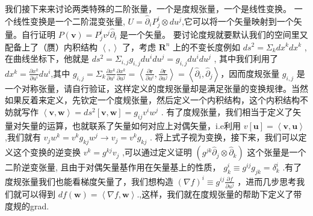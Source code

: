 \documentclass[supercite]{HustGraduPaper}
\newcommand{\inp}[2]{\left\langle #1,#2 \right\rangle}
\begin{document}
\begin{appendices}
		我们接下来来讨论两类特殊的二阶张量，一个是度规张量，一个是线性变换。
		一个线性变换是一个二阶混变张量, $U = \hat \partial_i P^i_j  \otimes du^j $,它可以将一个矢量映射到一个矢量。自行证明 $P(\mathbf{v}) = P^i_j v^j \hat \partial_i$ 是一个矢量。
		要讨论度规就要默认我们的空间里又配备上了（赝）内积结构 $\inp{ }{ }$ 了，考虑 $\mathbf{R}^n$ 上的不变长度例如 $ds^2 = \Sigma_k dx^k dx^k$ ,在曲线坐标下，他就是 $ds^2 = \Sigma_{i,j} g_{i,j}du^idu^j = g_{i,j}du^i du^j$ , 其中我们利用了 $dx^k = \frac{\partial x^k}{\partial u^i} du^i $,其中 $g_{i,j} = \Sigma_k \frac{\partial x^k}{\partial u^i} \frac{\partial x^k}{\partial u^j} = \inp{\frac{\partial\mathbf{r}}{\partial u^i}}{\frac{\partial\mathbf{r}}{\partial u^j}} = \inp{\hat \partial_i}{ \hat \partial_j}$，因而度规张量 $g_{i,j}$ 是一个对称张量，请自行验证，这样定义的度规张量却是满足张量的变换规律。当然如果反着来定义，先钦定一个度规张量，然后定义一个内积结构，这个内积结构不妨就写作 $\inp{\mathbf{v}}{\mathbf{w}} = ds^2[\mathbf{v},\mathbf{w}]=g_{ij}v^i w^j$ . 
		有了度规张量，我们相当于定义了矢量对矢量的运算，也就联系了矢量如何对应上对偶矢量，i.e利用 $v[\mathbf{u}] = \inp{\mathbf{v}}{\mathbf{u}}$ ,我们就有 $v_j w^k = v^k g_{kj} w^j \to v_j = v^k g_{kj}$ . 将上式子视为变换，接下来，我们可以定义这个变换的逆变换 $v^k = g^{kj}v_j$ ,可以通过定义证明 $(g^{jk} \hat \partial_j \otimes \hat \partial_k)$ 这个张量是一个二阶逆变张量, 且由于对偶矢量基作用在矢量基上的性质， $g^i_k \equiv g^{ij} g_{jk}  = \delta^i_k$ .有了度规张量我们也能看梯度矢量了，我们想构造 $(\nabla f)^i \equiv g^{ij} \frac{\partial f}{\partial u^j}$ ，进而几步思考我们就可以得到 $df(\mathbf{w}) =  \inp{\nabla f}{ \mathbf{w}} $.,这样，我们就在度规张量的帮助下定义了带度规的grad. 
		

\end{appendices}
\end{document}
